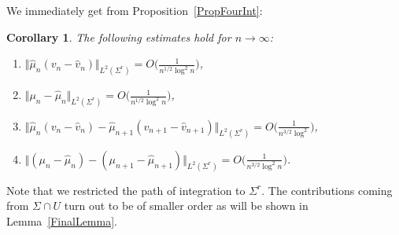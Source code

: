 \documentclass[11pt]{article}
\numberwithin{equation}{section}
\newcommand{\hmu}{{\widehat \mu}}
\newcommand{\bv}{v}
\newcommand{\hv}{{\widehat v}}
\newcommand{\Sigr}{\Sigma^r}
\newtheorem{Corollary}[Theorem]{Corollary}
\numberwithin{equation}{section}
\begin{document}
We immediately get from Proposition~\ref{PropFourInt}:
\begin{Corollary}\label{CorFourInt}
The following estimates hold for $n \to \infty$:
\begin{enumerate}[$(i)$]\itemsep=0pt
 \item $\Vert \hmu_n (\bv_n - \hv_n) \Vert_{L^2(\Sigr)} = O\big(\frac{1}{n^{1/2}\log^2 n}\big)$,
 \item $\Vert \mu_n - \hmu_n \Vert_{L^2(\Sigr)} = O\big(\frac{1}{n^{1/2}\log^2 n}\big)$,
 \item $\Vert \hmu_n (\bv_n - \hv_n) - \hmu_{n+1} (\bv_{n+1} - \hv_{n+1}) \Vert_{L^2(\Sigr)} = O\big(\frac{1}{n^{3/2}\log^2}
 \big)$,
 \item $\Vert (\mu_n - \hmu_n) - (\mu_{n+1} - \hmu_{n+1}) \Vert_{L^2(\Sigr)} = O\big(\frac{1}{n^{3/2}\log^2 n}\big)$.
\end{enumerate}
\end{Corollary}
Note that we restricted the path of integration to $\Sigr$. The contributions coming from $\Sigma \cap U$ turn out to be of smaller order as will be shown in Lemma~\ref{FinalLemma}.
\end{document}
